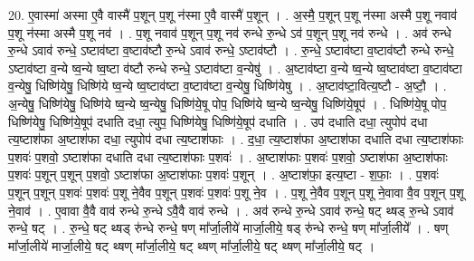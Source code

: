 \documentclass[17pt]{extarticle}
\begin{document}
20. ए॒वास्मा॑ अस्मा ए॒वै वास्मै॑ प॒शून् प॒शू न॑स्मा ए॒वै वास्मै॑ प॒शून् । . अ॒स्मै॒ प॒शून् प॒शू न॑स्मा अस्मै प॒शू नवाव॑ प॒शू न॑स्मा अस्मै प॒शू नव॑ । . प॒शू नवाव॑ प॒शून् प॒शू नव॑ रुन्धे रु॒न्धे ऽव॑ प॒शून् प॒शू नव॑ रुन्धे । . अव॑ रुन्धे रु॒न्धे ऽवाव॑ रुन्धे॒ ऽष्टाव॑ष्टा व॒ष्टाव॑ष्टौ रु॒न्धे ऽवाव॑ रुन्धे॒ ऽष्टाव॑ष्टौ । . रु॒न्धे॒ ऽष्टाव॑ष्टा व॒ष्टाव॑ष्टौ रुन्धे रुन्धे॒ ऽष्टाव॑ष्टा व॒न्ये ष्व॒न्ये ष्व॒ष्टा व॑ष्टौ रुन्धे रुन्धे॒ ऽष्टाव॑ष्टा व॒न्येषु॑ । . अ॒ष्टाव॑ष्टा व॒न्ये ष्व॒न्ये ष्व॒ष्टाव॑ष्टा व॒ष्टाव॑ष्टा व॒न्येषु॒ धिष्णि॑येषु॒ धिष्णि॑ये ष्व॒न्ये ष्व॒ष्टाव॑ष्टा व॒ष्टाव॑ष्टा व॒न्येषु॒ धिष्णि॑येषु । . अ॒ष्टाव॑ष्टा॒वित्य॒ष्टौ - अ॒ष्टौ॒ । . अ॒न्येषु॒ धिष्णि॑येषु॒ धिष्णि॑ये ष्व॒न्ये ष्व॒न्येषु॒ धिष्णि॑ये॒षू पोप॒ धिष्णि॑ये ष्व॒न्ये
ष्व॒न्येषु॒ धिष्णि॑ये॒षूप॑ । . धिष्णि॑ये॒षू पोप॒ धिष्णि॑येषु॒ धिष्णि॑ये॒षूप॑ दधाति दधा॒ त्युप॒ धिष्णि॑येषु॒ धिष्णि॑ये॒षूप॑ दधाति । . उप॑ दधाति दधा॒ त्युपोप॑ दधा त्य॒ष्टाश॑फा अ॒ष्टाश॑फा दधा॒ त्युपोप॑ दधा त्य॒ष्टाश॑फाः । . द॒धा॒ त्य॒ष्टाश॑फा अ॒ष्टाश॑फा दधाति दधा त्य॒ष्टाश॑फाः प॒शवः॑ प॒शवो॒ ऽष्टाश॑फा दधाति दधा त्य॒ष्टाश॑फाः प॒शवः॑ । . अ॒ष्टाश॑फाः प॒शवः॑ प॒शवो॒ ऽष्टाश॑फा अ॒ष्टाश॑फाः प॒शवः॑ प॒शून् प॒शून् प॒शवो॒ ऽष्टाश॑फा अ॒ष्टाश॑फाः प॒शवः॑ प॒शून् । . अ॒ष्टाश॑फा॒ इत्य॒ष्टा - श॒फाः॒ । . प॒शवः॑ प॒शून् प॒शून् प॒शवः॑ प॒शवः॑ प॒शू ने॒वैव प॒शून् प॒शवः॑ प॒शवः॑ प॒शू ने॒व । . प॒शू ने॒वैव प॒शून् प॒शू ने॒वावा वै॒व प॒शून् प॒शू ने॒वाव॑ । . ए॒वावा वै॒वै वाव॑ रुन्धे रु॒न्धे ऽवै॒वै वाव॑ रुन्धे । . अव॑ रुन्धे रु॒न्धे ऽवाव॑ रुन्धे॒ षट् थ्षड् रु॒न्धे ऽवाव॑ रुन्धे॒ षट् । . रु॒न्धे॒ षट् थ्षड् रु॑न्धे रुन्धे॒ षण् मा᳚र्जा॒लीये॑ मार्जा॒लीये॒ षड् रु॑न्धे रुन्धे॒ षण् मा᳚र्जा॒लीये᳚ । . षण् मा᳚र्जा॒लीये॑ मार्जा॒लीये॒ षट् थ्षण् मा᳚र्जा॒लीये॒ षट् थ्षण् मा᳚र्जा॒लीये॒ षट् थ्षण् मा᳚र्जा॒लीये॒ षट् । \newline
\end{document}
